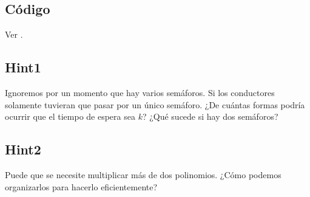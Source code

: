 \subsection*{Código}
Ver .

\subsection*{Hint1}
Ignoremos por un momento que hay varios semáforos. Si los conductores solamente tuvieran que pasar por un único semáforo. ¿De cuántas formas podría ocurrir que el tiempo de espera sea $k$? ¿Qué sucede si hay dos semáforos?
\subsection*{Hint2}
Puede que se necesite multiplicar más de dos polinomios. ¿Cómo podemos organizarlos para hacerlo eficientemente?
